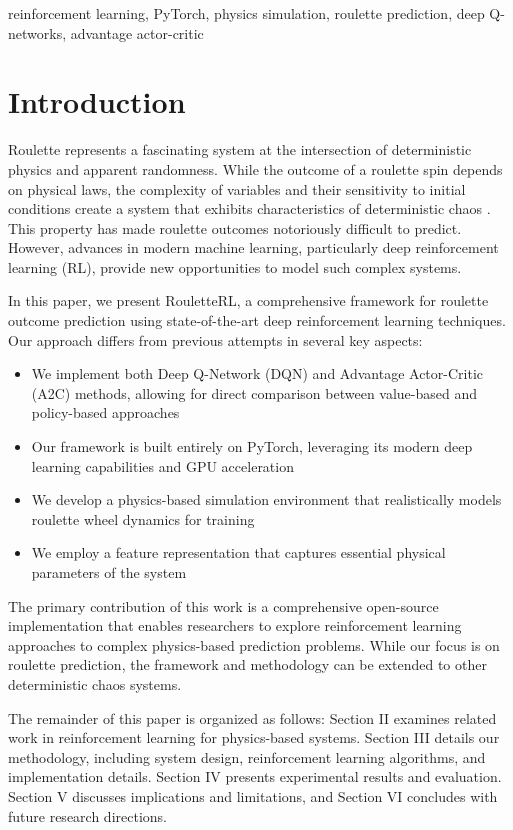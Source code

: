 \documentclass[conference]{IEEEtran}
\begin{document}
\begin{IEEEkeywords}
reinforcement learning, PyTorch, physics simulation, roulette prediction, deep Q-networks, advantage actor-critic
\end{IEEEkeywords}

\section{Introduction}
Roulette represents a fascinating system at the intersection of deterministic physics and apparent randomness. While the outcome of a roulette spin depends on physical laws, the complexity of variables and their sensitivity to initial conditions create a system that exhibits characteristics of deterministic chaos \cite{small2022chaos}. This property has made roulette outcomes notoriously difficult to predict. However, advances in modern machine learning, particularly deep reinforcement learning (RL), provide new opportunities to model such complex systems.

In this paper, we present RouletteRL, a comprehensive framework for roulette outcome prediction using state-of-the-art deep reinforcement learning techniques. Our approach differs from previous attempts in several key aspects:

\begin{itemize}
    \item We implement both Deep Q-Network (DQN) and Advantage Actor-Critic (A2C) methods, allowing for direct comparison between value-based and policy-based approaches
    \item Our framework is built entirely on PyTorch, leveraging its modern deep learning capabilities and GPU acceleration
    \item We develop a physics-based simulation environment that realistically models roulette wheel dynamics for training
    \item We employ a feature representation that captures essential physical parameters of the system
\end{itemize}

The primary contribution of this work is a comprehensive open-source implementation that enables researchers to explore reinforcement learning approaches to complex physics-based prediction problems. While our focus is on roulette prediction, the framework and methodology can be extended to other deterministic chaos systems.

The remainder of this paper is organized as follows: Section II examines related work in reinforcement learning for physics-based systems. Section III details our methodology, including system design, reinforcement learning algorithms, and implementation details. Section IV presents experimental results and evaluation. Section V discusses implications and limitations, and Section VI concludes with future research directions.
\end{document}

